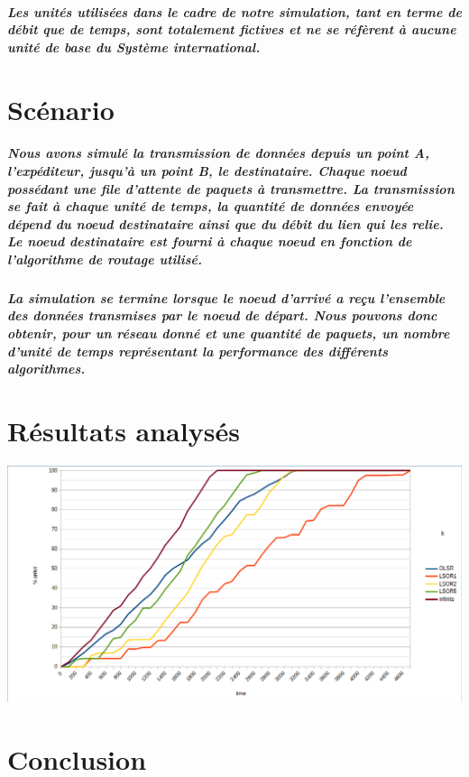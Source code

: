 \documentclass{report}
\begin{document}
\paragraph{Les unités utilisées dans le cadre de notre simulation, tant en terme de débit que de temps, sont totalement fictives et ne se réfèrent à aucune unité de base du Système international.}

\chapter{Scénario}

\paragraph{Nous avons simulé la transmission de données depuis un point A, l'expéditeur, jusqu'à un point B, le destinataire. Chaque noeud possédant une file d'attente de paquets à transmettre. La transmission se fait à chaque unité de temps, la quantité de données envoyée dépend du noeud destinataire ainsi que du débit du lien qui les relie. Le noeud destinataire est fourni à chaque noeud en fonction de l'algorithme de routage utilisé.}

\paragraph{La simulation se termine lorsque le noeud d'arrivé a reçu l'ensemble des données transmises par le noeud de départ. Nous pouvons donc obtenir, pour un réseau donné et une quantité de paquets, un nombre d'unité de temps représentant la performance des différents algorithmes.}

\paragraph{}

\chapter{Résultats analysés}

\begin{center}
\includegraphics[scale=0.4]{quentin_result/courbes.png}
\end{center}

\paragraph{}

\chapter{Conclusion}

\paragraph{}
\end{document}
